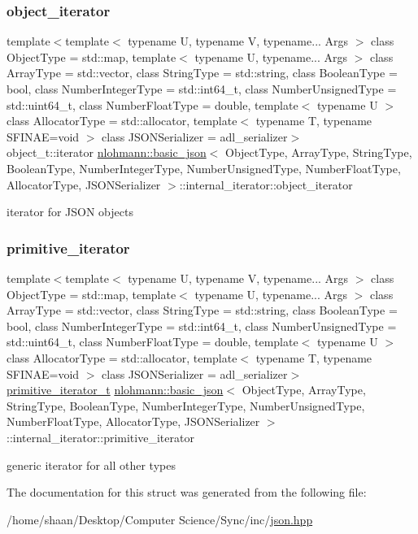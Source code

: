 \subsubsection{\texorpdfstring{object\+\_\+iterator}{object\_iterator}}
{\footnotesize\ttfamily template$<$template$<$ typename U, typename V, typename... Args $>$ class Object\+Type = std\+::map, template$<$ typename U, typename... Args $>$ class Array\+Type = std\+::vector, class String\+Type  = std\+::string, class Boolean\+Type  = bool, class Number\+Integer\+Type  = std\+::int64\+\_\+t, class Number\+Unsigned\+Type  = std\+::uint64\+\_\+t, class Number\+Float\+Type  = double, template$<$ typename U $>$ class Allocator\+Type = std\+::allocator, template$<$ typename T, typename S\+F\+I\+N\+A\+E=void $>$ class J\+S\+O\+N\+Serializer = adl\+\_\+serializer$>$ \\
object\+\_\+t\+::iterator \hyperlink{classnlohmann_1_1basic__json}{nlohmann\+::basic\+\_\+json}$<$ Object\+Type, Array\+Type, String\+Type, Boolean\+Type, Number\+Integer\+Type, Number\+Unsigned\+Type, Number\+Float\+Type, Allocator\+Type, J\+S\+O\+N\+Serializer $>$\+::internal\+\_\+iterator\+::object\+\_\+iterator}



iterator for J\+S\+ON objects 

\mbox{\label{structnlohmann_1_1basic__json_1_1internal__iterator_ac1938c3d3d3d713b68a7a82d7cb569eb}} 
\subsubsection{\texorpdfstring{primitive\+\_\+iterator}{primitive\_iterator}}
{\footnotesize\ttfamily template$<$template$<$ typename U, typename V, typename... Args $>$ class Object\+Type = std\+::map, template$<$ typename U, typename... Args $>$ class Array\+Type = std\+::vector, class String\+Type  = std\+::string, class Boolean\+Type  = bool, class Number\+Integer\+Type  = std\+::int64\+\_\+t, class Number\+Unsigned\+Type  = std\+::uint64\+\_\+t, class Number\+Float\+Type  = double, template$<$ typename U $>$ class Allocator\+Type = std\+::allocator, template$<$ typename T, typename S\+F\+I\+N\+A\+E=void $>$ class J\+S\+O\+N\+Serializer = adl\+\_\+serializer$>$ \\
\hyperlink{classnlohmann_1_1basic__json_1_1primitive__iterator__t}{primitive\+\_\+iterator\+\_\+t} \hyperlink{classnlohmann_1_1basic__json}{nlohmann\+::basic\+\_\+json}$<$ Object\+Type, Array\+Type, String\+Type, Boolean\+Type, Number\+Integer\+Type, Number\+Unsigned\+Type, Number\+Float\+Type, Allocator\+Type, J\+S\+O\+N\+Serializer $>$\+::internal\+\_\+iterator\+::primitive\+\_\+iterator}



generic iterator for all other types 



The documentation for this struct was generated from the following file\+:\begin{DoxyCompactItemize}
\item 
/home/shaan/\+Desktop/\+Computer Science/\+Sync/inc/\hyperlink{json_8hpp}{json.\+hpp}\end{DoxyCompactItemize}
